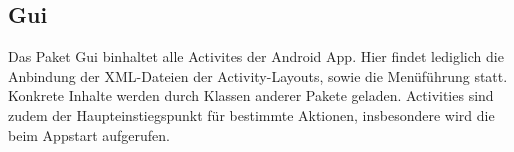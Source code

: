 \label{app:module:gui}\subsection{Gui}
Das Paket Gui binhaltet alle Activites der Android App. Hier findet lediglich die Anbindung der XML-Dateien der Activity-Layouts, sowie die Menüführung statt. Konkrete Inhalte werden durch Klassen anderer Pakete geladen. Activities sind zudem der Haupteinstiegspunkt für bestimmte Aktionen, insbesondere wird die  beim Appstart aufgerufen.